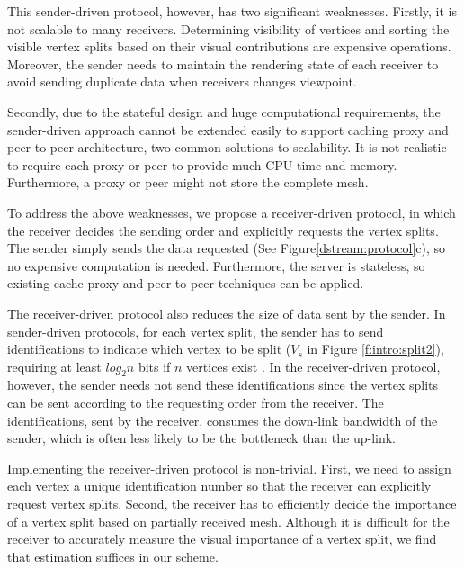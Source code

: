     This sender-driven protocol, however, has two significant weaknesses.
    Firstly, it is not scalable to many receivers. Determining visibility of vertices
    and sorting the visible vertex splits based on their visual contributions
    are expensive operations. 
    Moreover, the sender needs to maintain
    the rendering state of each receiver to avoid sending duplicate data when receivers
    changes viewpoint.

    Secondly, due to the stateful design and huge computational requirements,
    the sender-driven approach cannot be extended easily to support 
    caching proxy and peer-to-peer architecture, two common solutions to scalability. It is not realistic
    to require each proxy or peer to provide much CPU time and memory. 
    Furthermore, a proxy or peer might not store the complete mesh.

    To address the above weaknesses, we propose a receiver-driven protocol,
    in which the receiver decides the sending order and explicitly requests
    the vertex splits. The sender simply sends the data requested 
    (See Figure\ref{dstream:protocol}c), so no expensive computation is needed.
    Furthermore, the server is stateless, so
    existing cache proxy and peer-to-peer techniques can be applied.

    The receiver-driven protocol also reduces the size of data sent by the sender.
    In sender-driven protocols, for each vertex split, the sender has to send identifications
    to indicate which vertex to be split ($V_s$ in Figure \ref{f:intro:split2}),
    requiring at least $log_2{n}$ bits if $n$ vertices exist \cite{258843}. 
    In the receiver-driven protocol, however, the sender needs not send
    these identifications since the vertex splits can be sent according to
    the requesting order from the receiver. The identifications, sent
    by the receiver, consumes the down-link bandwidth 
    of the sender, which is often less likely to be the bottleneck than the up-link.

    Implementing the receiver-driven protocol is non-trivial. First, we need
    to assign each vertex a unique identification number so that the receiver
    can explicitly request vertex splits. Second, the receiver has to efficiently decide the
    importance of a vertex split based on partially received mesh.
    Although it is difficult for the receiver to accurately measure
    the visual importance of a vertex split, we find that estimation suffices
    in our scheme.  

